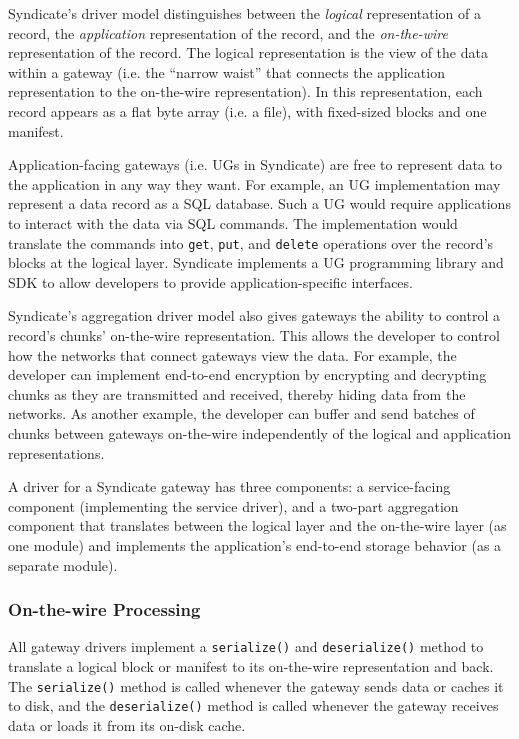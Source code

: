 Syndicate's driver model distinguishes between the \emph{logical} representation of a record,
the \emph{application} representation of the record, and the 
\emph{on-the-wire} representation of the record.  The logical representation is
the view of the data within a gateway (i.e. the ``narrow waist'' that connects
the application representation to the on-the-wire representation).  In this
representation, each record appears as a flat byte array (i.e. a file), with
fixed-sized blocks and one manifest.

Application-facing gateways (i.e. UGs in Syndicate) are free to represent data 
to the application in any way they want.  For example, an UG implementation
may represent a data record as a
SQL database.  Such a UG would require applications to interact with the data
via SQL commands.  The implementation would translate the commands into
\texttt{get}, \texttt{put}, and \texttt{delete} operations over the record's
blocks at the logical layer.  Syndicate implements a UG programming library and
SDK to allow developers to provide application-specific interfaces.

Syndicate's aggregation driver model also gives gateways the ability to
control a record's chunks' on-the-wire representation.  This allows the
developer to control how the networks that connect gateways view the data.  For
example, the developer can implement end-to-end encryption by encrypting and
decrypting chunks as they are transmitted and received, thereby hiding
data from the networks.  As another example, the developer can buffer and send
batches of chunks between gateways on-the-wire independently of the logical and
application representations.

A driver for a Syndicate gateway has three components:  a service-facing
component (implementing the service driver), and a two-part aggregation
component that translates between the logical layer and the on-the-wire layer
(as one module) and implements the application's end-to-end storage behavior (as
a separate module).

\subsubsection{On-the-wire Processing}

All gateway drivers implement a \texttt{serialize()} and \texttt{deserialize()}
method to translate a logical block or manifest to its on-the-wire
representation and back.  The \texttt{serialize()} method is called whenever the gateway sends
data or caches it to disk, and the \texttt{deserialize()} method is called
whenever the gateway receives data or loads it from its on-disk cache.

